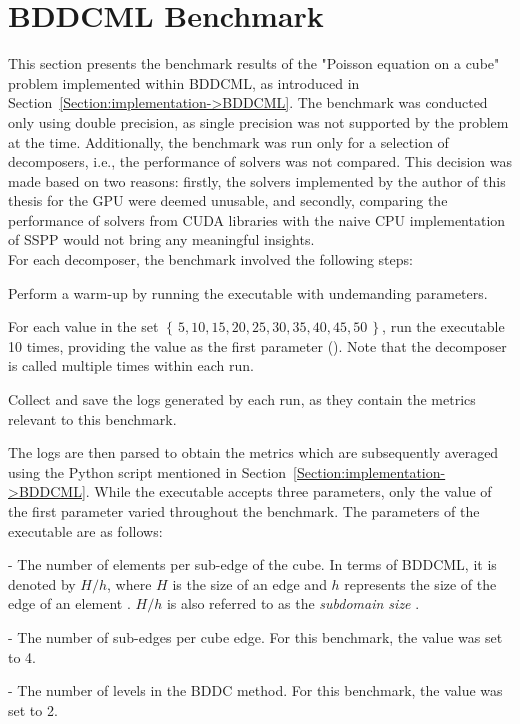 \section{BDDCML Benchmark}\label{Section:comparing-decomposers-and-solvers->bddcml-benchmark}
This section presents the benchmark results of the "Poisson equation on a cube" problem implemented within BDDCML, as introduced in Section~\ref{Section:implementation->BDDCML}.
The benchmark was conducted only using double precision, as single precision was not supported by the problem at the time.
Additionally, the benchmark was run only for a selection of decomposers, i.e., the performance of solvers was not compared.
This decision was made based on two reasons: firstly, the solvers implemented by the author of this thesis for the GPU were deemed unusable, and secondly, comparing the performance of solvers from CUDA libraries with the naive CPU implementation of SSPP would not bring any meaningful insights.\\
For each decomposer, the benchmark involved the following steps:

\begin{tight_enumerate}
	\item Perform a warm-up by running the  executable with undemanding parameters.
	\item For each value in the set $\left\{\, 5, 10, 15, 20, 25, 30, 35, 40, 45, 50\,\right\}$, run the  executable 10 times, providing the value as the first parameter ().
		Note that the decomposer is called multiple times within each run.
	\item Collect and save the logs generated by each run, as they contain the metrics relevant to this benchmark.
\end{tight_enumerate}

The logs are then parsed to obtain the metrics which are subsequently averaged using the Python script mentioned in Section~\ref{Section:implementation->BDDCML}.
While the  executable accepts three parameters, only the value of the first parameter varied throughout the benchmark.
The parameters of the executable are as follows:

\begin{tight_enumerate}
	\item {} - The number of elements per sub-edge of the cube.
In terms of BDDCML, it is denoted by $H/h$, where $H$ is the size of an edge and $h$ represents the size of the edge of an element \cite{6ZBqOb318XgFqC5W}. $H/h$ is also referred to as the \textit{subdomain size} \cite{6ZBqOb318XgFqC5W}.
	\item {} - The number of sub-edges per cube edge.
For this benchmark, the value was set to 4.
	\item {} - The number of levels in the BDDC method.
For this benchmark, the value was set to 2.
\end{tight_enumerate}

